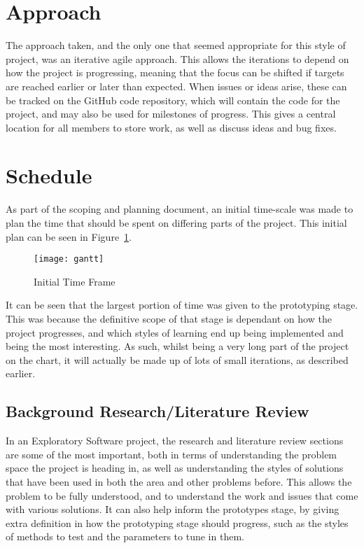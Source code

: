 \section{Approach}

The approach taken, and the only one that seemed appropriate for this style of
project, was an iterative agile approach. This allows the iterations to depend
on how the project is progressing, meaning that the focus can be shifted if targets
are reached earlier or later than expected.
When issues or ideas arise, these can be tracked on the GitHub code repository,
which will contain the code for the project, and may also be used for milestones
of progress. This gives a central location for all members to store work, as well
as discuss ideas and bug fixes.

\section{Schedule}

As part of the scoping and planning document, an initial time-scale was made
to plan the time that should be spent on differing parts of the project.
This initial plan can be seen in Figure~\ref{fig:gantt}.

\begin{figure}[h!]
    \centering
    \texttt{[image: gantt]}
    \caption{Initial Time Frame}%
    \label{fig:gantt}
\end{figure}

It can be seen that the largest portion of time was given to the prototyping
stage. This was because the definitive scope of that stage is dependant on how
the project progresses, and which styles of learning end up being implemented and
being the most interesting. As such, whilst being a very long part of the project
on the chart, it will actually be made up of lots of small iterations, as described
earlier.

\subsection{Background Research/Literature Review}

In an Exploratory Software project, the research and literature review sections
are some of the most important, both in terms of understanding the problem
space the project is heading in, as well as understanding the styles of
solutions that have been used in both the area and other problems before.
This allows the problem to be fully understood, and to understand the work
and issues that come with various solutions. It can also help inform
the prototypes stage, by giving extra definition in how the prototyping stage
should progress, such as the styles of methods to test and the parameters to tune
in them.

